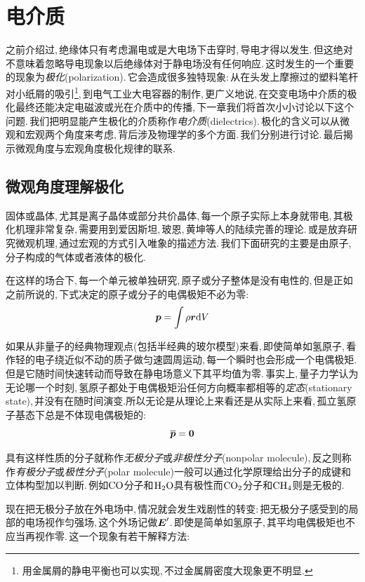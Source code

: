 \section{电介质}

之前介绍过,\,绝缘体只有考虑漏电或是大电场下击穿时,\,导电才得以发生.\,但这绝对不意味着忽略导电现象以后绝缘体对于静电场没有任何响应.\,这时发生的一个重要的现象为\emph{极化}(polarization).\,它会造成很多独特现象:\,从在头发上摩擦过的塑料笔杆对小纸屑的吸引\footnote{用金属屑的静电平衡也可以实现,\,不过金属屑密度大现象更不明显.},\,到电气工业大电容器的制作,\,更广义地说,\,在交变电场中介质的极化最终还能决定电磁波或光在介质中的传播,\,下一章我们将首次小小讨论以下这个问题.\,我们把明显能产生极化的介质称作\emph{电介质}(dielectrics).\,极化的含义可以从微观和宏观两个角度来考虑,\,背后涉及物理学的多个方面.\,我们分别进行讨论.\,最后揭示微观角度与宏观角度极化规律的联系.\,

\subsection{微观角度理解极化}

固体或晶体,\,尤其是离子晶体或部分共价晶体,\,每一个原子实际上本身就带电,\,其极化机理非常复杂,\,需要用到爱因斯坦,\,玻恩,\,黄坤等人的陆续完善的理论.\,或是放弃研究微观机理,\,通过宏观的方式引入唯象的描述方法.\,我们下面研究的主要是由原子,\,分子构成的气体或者液体的极化.

在这样的场合下,\,每一个单元被单独研究,\,原子或分子整体是没有电性的,\,但是正如之前所说的,\,下式决定的原子或分子的电偶极矩不必为零:
\[\boldsymbol{p}=\int \rho \boldsymbol{r} \textrm{d} V\]

如果从非量子的经典物理观点(包括半经典的玻尔模型)来看,\,即使简单如氢原子,\,看作轻的电子绕近似不动的质子做匀速圆周运动,\,每一个瞬时也会形成一个电偶极矩.\,但是它随时间快速转动而导致在静电场意义下其平均值为零.\,事实上,\,量子力学认为无论哪一个时刻,\,氢原子都处于电偶极矩沿任何方向概率都相等的\emph{定态}(stationary state),\,并没有在随时间演变.\.所以无论是从理论上来看还是从实际上来看,\,孤立氢原子基态下总是不体现电偶极矩的:
\[\overline{\boldsymbol{p}}=\boldsymbol{0}\]

具有这样性质的分子就称作\emph{无极分子}或\emph{非极性分子}(nonpolar molecule),\,反之则称作\emph{有极分子}或\emph{极性分子}(polar molecule)一般可以通过化学原理给出分子的成键和立体构型加以判断.\,例如${\rm CO}$分子和${\rm H_2 O}$具有极性而${\rm CO_2}$分子和${\rm CH_4}$则是无极的.

现在把无极分子放在外电场中,\,情况就会发生戏剧性的转变:\,把无极分子感受到的局部的电场视作匀强场,\,这个外场记做$\boldsymbol{E}'$.\,即使是简单如氢原子,\,其平均电偶极矩也不应当再视作零.\,这一个现象有若干解释方法:

